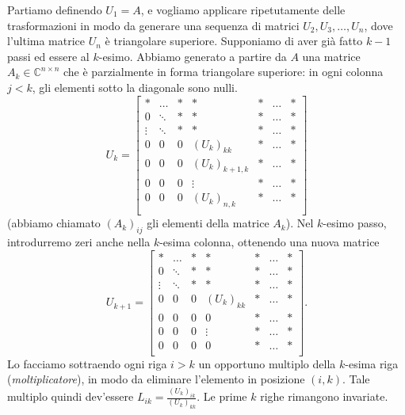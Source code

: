 \documentclass[a4paper]{report}
\theoremstyle{definiton}
\theoremstyle{remark}
\begin{document}
Partiamo definendo $U_1 = A$, e vogliamo applicare ripetutamente delle trasformazioni in modo da generare una sequenza di matrici $U_2, U_3, \dots, U_n$, dove l'ultima matrice $U_n$ è triangolare superiore. Supponiamo di aver già fatto $k-1$ passi ed essere al $k$-esimo. Abbiamo generato a partire da $A$ una matrice $A_k \in\mathbb{C}^{n\times n}$ che è parzialmente in forma triangolare superiore: in ogni colonna $j<k$, gli elementi sotto la diagonale sono nulli. 
\[
U_k = \begin{bmatrix}
    \ast & \dots & \ast & \ast & \ast & \dots & \ast\\
    0 & \ddots & \ast& \ast & \ast& \dots & \ast\\
    \vdots & \ddots & \ast & \ast& \ast & \dots & \ast\\
    0& 0  &0 & (U_k)_{kk} & \ast & \dots & \ast\\
    0& 0  &0 & (U_k)_{k+1,k} & \ast & \dots & \ast\\
    0& 0  &0 & \vdots & \ast & \dots & \ast\\
    0& 0  &0 & (U_k)_{n,k} & \ast & \dots & \ast\\
\end{bmatrix}
\]
(abbiamo chiamato $(A_k)_{ij}$ gli elementi della matrice $A_k$).
Nel $k$-esimo passo, introdurremo zeri anche nella $k$-esima colonna, ottenendo una nuova matrice 
\[
U_{k+1} = \begin{bmatrix}
    \ast & \dots & \ast & \ast & \ast & \dots & \ast\\
    0 & \ddots & \ast& \ast & \ast& \dots & \ast\\
    \vdots & \ddots & \ast & \ast& \ast & \dots & \ast\\
    0& 0  &0 & (U_k)_{kk} & \ast & \dots & \ast\\
    0& 0  &0 & 0 & \ast & \dots & \ast\\
    0& 0  &0 & \vdots & \ast & \dots & \ast\\
    0& 0  &0 & 0 & \ast & \dots & \ast\\
\end{bmatrix}.
\]
Lo facciamo sottraendo ogni riga $i>k$ un opportuno multiplo della $k$-esima riga (\emph{moltiplicatore}), in modo da eliminare l'elemento in posizione $(i,k)$. Tale multiplo quindi dev'essere $L_{ik} = \frac{(U_k)_{ik}}{(U_k)_{kk}}$. Le prime $k$ righe rimangono invariate.
\end{document}

